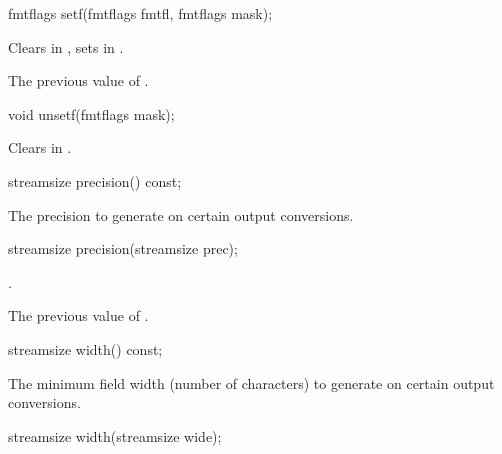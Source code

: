 %
\begin{itemdecl}
fmtflags setf(fmtflags fmtfl, fmtflags mask);
\end{itemdecl}

\begin{itemdescr}
\pnum
\effects
Clears  in
,
sets
in
.

\pnum
\returns
The previous value of
.
\end{itemdescr}

%
\begin{itemdecl}
void unsetf(fmtflags mask);
\end{itemdecl}

\begin{itemdescr}
\pnum
\effects
Clears  in
.
\end{itemdescr}

%
\begin{itemdecl}
streamsize precision() const;
\end{itemdecl}

\begin{itemdescr}
\pnum
\returns
The precision
to generate on certain output conversions.
\end{itemdescr}

%
\begin{itemdecl}
streamsize precision(streamsize prec);
\end{itemdecl}

\begin{itemdescr}
\pnum
\postconditions
{}.

\pnum
\returns
The previous value of
.
\end{itemdescr}

%
\begin{itemdecl}
streamsize width() const;
\end{itemdecl}

\begin{itemdescr}
\pnum
\returns
The minimum field width (number of characters) to generate on certain output
conversions.
\end{itemdescr}

%
\begin{itemdecl}
streamsize width(streamsize wide);
\end{itemdecl}


